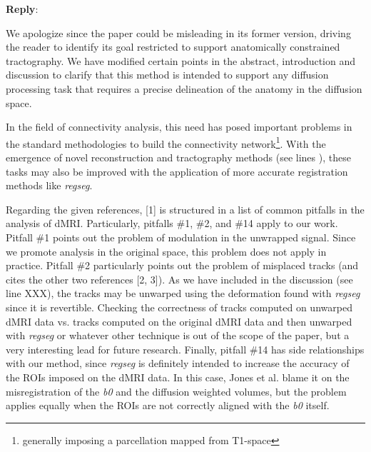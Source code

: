 \documentclass[9pt]{memoir}
\newcommand{\reply}{\par\fontshape{n}\selectfont \noindent \textbf{Reply}:\ }
\begin{document}
\reply{%
We apologize since the paper could be misleading in its former version, driving
  the reader to identify its goal restricted to support anatomically constrained
  tractography.
We have modified certain points in the abstract, introduction and discussion to
  clarify that this method is intended to support any diffusion processing task that
  requires a precise delineation of the anatomy in the diffusion space.

In the field of connectivity analysis, this need has posed important problems in the
  standard methodologies to build the connectivity network\footnote{generally imposing
  a parcellation mapped from T1-space}.
With the emergence of novel reconstruction and tractography methods (see lines ),
  these tasks may also be improved with the application of more accurate registration
  methods like \emph{regseg}.

Regarding the given references, [1] is structured in a list of common pitfalls in the
  analysis of dMRI.
Particularly, pitfalls \#1, \#2, and \#14 apply to our work.
Pitfall \#1 points out the problem of modulation in the unwrapped signal.
Since we promote analysis in the original space, this problem does not apply in practice.
Pitfall \#2 particularly points out the problem of misplaced tracks (and cites
  the other two references [2, 3]).
As we have included in the discussion (see line XXX), the tracks may be unwarped using
  the deformation found with \emph{regseg} since it is revertible.
Checking the correctness of tracks computed on unwarped dMRI data vs. tracks computed
  on the original dMRI data and then unwarped with \emph{regseg} or whatever other
  technique is out of the scope of the paper, but a very interesting lead for
  future research.
Finally, pitfall \#14 has side relationships with our method, since \emph{regseg} is
  definitely intended to increase the accuracy of the ROIs imposed on the dMRI data.
In this case, Jones et al. blame it on the misregistration of the \emph{b0} and the
  diffusion weighted volumes, but the problem applies equally when the ROIs are
  not correctly aligned with the \emph{b0} itself.
}
\end{document}
